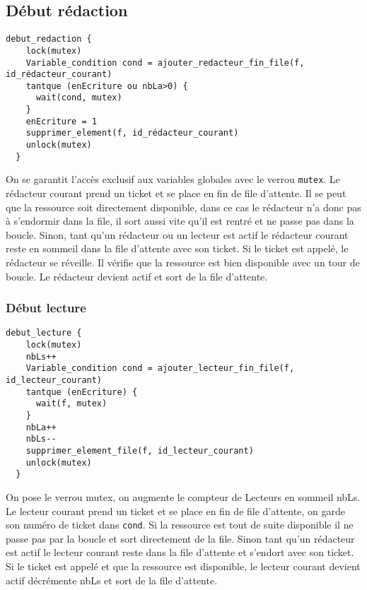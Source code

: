 \documentclass[11pt]{article}
\theoremstyle{definition}
\theoremstyle{definition}
\begin{document}
\subsection{Début rédaction}
\begin{lstlisting}[columns=fixed,basicstyle=\small\ttfamily]
  debut_redaction {
    lock(mutex)
    Variable_condition cond = ajouter_redacteur_fin_file(f, id_rédacteur_courant)
    tantque (enEcriture ou nbLa>0) {
      wait(cond, mutex)
    }
    enEcriture = 1
    supprimer_element(f, id_rédacteur_courant)
    unlock(mutex)
  }
\end{lstlisting}

On se garantit l'accès exclusif aux variables globales avec le verrou \texttt{mutex}.
Le rédacteur courant prend un ticket et se place en fin de file d'attente. Il se peut que la ressource soit directement disponible, dans ce cas le rédacteur n'a donc pas à s'endormir dans la file, il sort aussi vite qu'il est rentré et ne passe pas dans la boucle. Sinon, tant qu'un rédacteur ou un lecteur est actif le rédacteur courant reste en sommeil dans la file d'attente avec son ticket. Si le ticket est appelé, le rédacteur se réveille. Il vérifie que la ressource est bien disponible avec un tour de boucle. Le rédacteur devient actif et sort de la file d'attente.

\subsubsection{Début lecture}
\begin{lstlisting}[columns=fixed,basicstyle=\small\ttfamily]
  debut_lecture {
    lock(mutex)
    nbLs++
    Variable_condition cond = ajouter_lecteur_fin_file(f, id_lecteur_courant)
    tantque (enEcriture) {
      wait(f, mutex)
    }
    nbLa++
    nbLs--
    supprimer_element_file(f, id_lecteur_courant)
    unlock(mutex)
  }
\end{lstlisting}

On pose le verrou mutex, on augmente le compteur de Lecteurs en sommeil nbLs.
Le lecteur courant prend un ticket et se place en fin de file d'attente, on garde son numéro de ticket dans \texttt{cond}. Si la ressource est tout de suite disponible il ne passe pas par la boucle et sort directement de la file. Sinon tant qu'un rédacteur est actif le lecteur courant reste dans la file d'attente et s'endort avec son ticket. Si le ticket est appelé et que la ressource est disponible, le lecteur courant devient actif décrémente nbLs et sort de la file d'attente.
\end{document}
